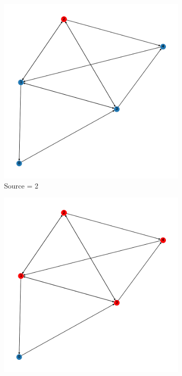 \documentclass{article}
\begin{document}
\begin{problem}
\begin{figure}[!h]
    \centering
    \begin{subfigure}{0.2\textwidth}
        \includegraphics[width=\textwidth]{./img/P1_1/frame0.png}
        \caption{Source = 2}
    \end{subfigure}
    \begin{subfigure}{0.2\textwidth}
        \includegraphics[width=\textwidth]{./img/P1_1/frame1.png}

\end{subfigure}
\end{figure}
\end{problem}
\end{document}
